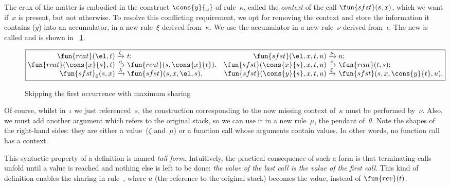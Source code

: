 The crux of the matter is embodied in the construct
\(\cons{y}{\texttt{\textvisiblespace}}\) of rule~\(\kappa\), called
the \emph{context} of the
call \(\fun{sfst}(s,x)\), which we want
if~\(x\) is present, but not otherwise. To resolve this conflicting
requirement, we opt for removing the context and store the information
it contains (\(y\)) into an accumulator, in a new rule~\(\xi\) derived
from~\(\kappa\). We use the accumulator in a new rule~\(\nu\) derived
from~\(\iota\). The new  is called
 and is shown in
\fig~\ref{fig:sfst0}.
\begin{figure}[b]
\begin{equation*}
\boxed{%
\begin{array}{@{}r@{\;}l@{\;}lr@{\;}l@{\;}l@{}}
\fun{rcat}(\el,t)              & \xrightarrow{\smash{\zeta}} & t; &
\fun{sfst}(\el,x,t,u)          & \xrightarrow{\smash{\mu}} & u;\\
\fun{rcat}(\cons{x}{s},t)      & \xrightarrow{\smash{\eta}}
                               & \fun{rcat}(s,\cons{x}{t}). &
\fun{sfst}(\cons{x}{s},x,t,u)  & \xrightarrow{\smash{\nu}}
                               & \fun{rcat}(t,s);\\
\fun{sfst}_0(s,x)              & \xrightarrow{\smash{\lambda}}
                               & \fun{sfst}(s,x,\el,s). &
\fun{sfst}(\cons{y}{s},x,t,u)  & \xrightarrow{\smash{\xi}}
                               & \fun{sfst}(s,x,\cons{y}{t},u).
\end{array}}
\end{equation*}
\caption{Skipping the first occurrence with maximum sharing}
\label{fig:sfst0}
\end{figure}
Of course, whilst in~\(\iota\) we just referenced~\(s\), the
construction corresponding to the now missing context of~\(\kappa\)
must be performed by~\(\nu\). Also, we must add another argument which
refers to the original stack, so we can use it in a new rule~\(\mu\),
the pendant of~\(\theta\). Note the shapes of the right\hyp{}hand
sides: they are either a value~(\(\zeta\) and~\(\mu\)) or a function
call whose arguments contain values. In other words, no function call
has a context.

This syntactic property of a definition is named \emph{tail
  form}. Intuitively, the
practical consequence of such a form is that terminating calls unfold
until a value is reached and nothing else is left to be done:
\emph{the value of the last call is the value of the first call}. This
kind of definition enables the sharing in rule~\clause{\mu}, where
\(u\) (the reference to the original stack) becomes the value, instead
of \(\fun{rev}(t)\).

